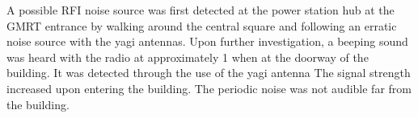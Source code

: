 \documentclass[a4paper,12pt]{article}
\begin{document}

                                                                                                                                                                                                                                                                                                                                                                                                                                                                                                                                                                                                                                                                                                                                                                                                                                                                                                                                                                                                                                                                                                                                                               A possible RFI noise source was first detected at the power station hub at the GMRT entrance by walking around the central square and following an erratic noise source with the yagi antennas. Upon further investigation, a beeping sound was heard with the radio at approximately \unit{1}{\hertz} when at the doorway of the building. It was detected through the use of the yagi antenna The signal strength increased upon entering the building. The periodic noise was not audible far from the building.
\end{document}
